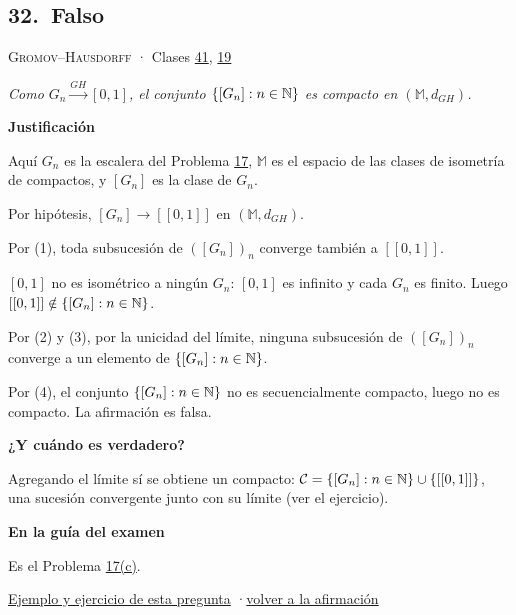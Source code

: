 \documentclass[11pt,a4paper]{article}
\newcommand{\bloque}[1]{\par\smallskip\noindent\textbf{\color{acento}#1}\par}
\begin{document}
\subsection*{\hypertarget{r-32}{}32.\ \textcolor{bad}{Falso}}
{\small \textsc{Gromov–Hausdorff} · Clases \href{https://decostruttivismo.github.io/MAT2514-repaso/pdf/MAT2514_apuntes_completos.pdf\#nameddest=section.41}{41}, \href{https://decostruttivismo.github.io/MAT2514-repaso/pdf/MAT2514_apuntes_completos.pdf\#nameddest=section.19}{19}}\par
\emph{Como $G_n\xrightarrow{GH}[0,1]$, el conjunto $\{[G_n]:n\in\mathbb{N}\}$ es compacto en $(\mathbb M,d_{GH})$.}
\bloque{Justificación}
\begin{pasos}
\item[] Aquí $G_n$ es la escalera del Problema \hyperlink{prob-17}{17}, $\mathbb M$ es el espacio de las clases de isometría de compactos, y $[G_n]$ es la clase de $G_n$.
\item[(1)] Por hipótesis, $[G_n]\to[[0,1]]$ en $(\mathbb M,d_{GH})$.
\item[(2)] Por (1), toda subsucesión de $([G_n])_n$ converge también a $[[0,1]]$.
\item[(3)] $[0,1]$ no es isométrico a ningún $G_n$: $[0,1]$ es infinito y cada $G_n$ es finito. Luego $[[0,1]]\notin\{[G_n]:n\in\mathbb{N}\}$.
\item[(4)] Por (2) y (3), por la unicidad del límite, ninguna subsucesión de $([G_n])_n$ converge a un elemento de $\{[G_n]:n\in\mathbb{N}\}$.
\item[] Por (4), el conjunto $\{[G_n]:n\in\mathbb{N}\}$ no es secuencialmente compacto, luego no es compacto. La afirmación es falsa.
\end{pasos}
\bloque{¿Y cuándo es verdadero?}
\begin{pasos}
\item[] Agregando el límite sí se obtiene un compacto: $\mathcal C=\{[G_n]:n\in\mathbb{N}\}\cup\{[[0,1]]\}$, una sucesión convergente junto con su límite (ver el ejercicio).
\end{pasos}
\bloque{En la guía del examen}
\begin{pasos}
\item[] Es el Problema \hyperlink{prob-17}{17(c)}.
\end{pasos}
\par{}
\par{\small \hyperlink{e-32}{Ejemplo y ejercicio de esta pregunta} \quad·\quad \hyperlink{q-32}{volver a la afirmación}}
\end{document}
